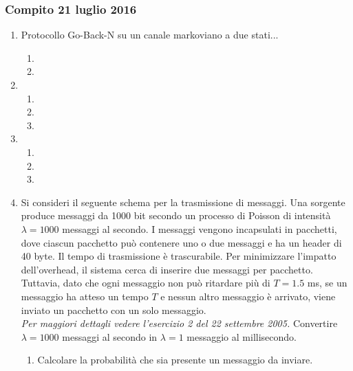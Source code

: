 \documentclass{article}
\begin{document}
\subsubsection{Compito 21 luglio 2016}
\begin{enumerate}
    \item Protocollo Go-Back-N su un canale markoviano a due stati...
    \begin{enumerate}[label=\alph*)]
        \item
        \item
    \end{enumerate}
    
    \item\begin{enumerate}[label=\alph*)]
        \item
        \item
        \item
    \end{enumerate}
    
    \item\begin{enumerate}[label=\alph*)]
        \item
        \item
        \item
    \end{enumerate}
    
    \item Si consideri il seguente schema per la trasmissione di messaggi.
    Una sorgente produce messaggi da 1000 bit secondo un processo di Poisson di intensità $\lambda = 1000$ messaggi al secondo.
    I messaggi vengono incapsulati in pacchetti, dove ciascun pacchetto può contenere uno o due messaggi e ha un header di 40 byte.
    Il tempo di trasmissione è trascurabile.
    Per minimizzare l'impatto dell'overhead, il sistema cerca di inserire due messaggi per pacchetto.
    Tuttavia, dato che ogni messaggio non può ritardare più di $T=1.5$ ms, se un messaggio ha atteso un tempo $T$ e nessun altro messaggio è arrivato, viene inviato un pacchetto con un solo messaggio.\\
    
    \emph{Per maggiori dettagli vedere l'esercizio 2 del 22 settembre 2005.}
    Convertire $\lambda = 1000$ messaggi al secondo in $\lambda = 1$ messaggio al millisecondo.
    \begin{enumerate}[label=\alph*)]
        \item Calcolare la probabilità che sia presente un messaggio da inviare.\\
        

\end{enumerate}
\end{enumerate}
\end{document}
